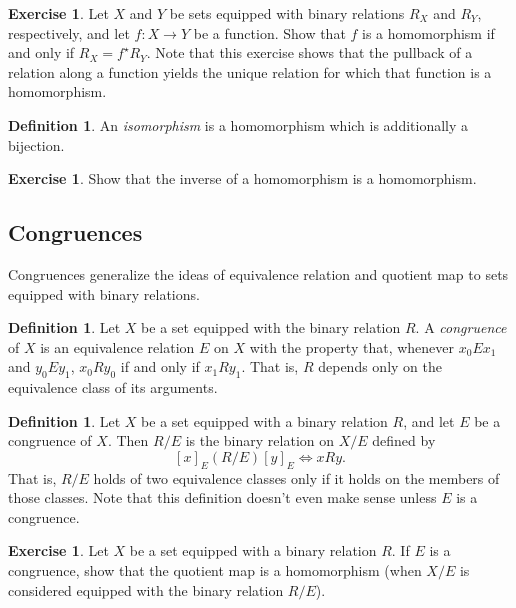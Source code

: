 \documentclass[letterpaper]{article}
\theoremstyle{definition}
\newtheorem{definition}[theorem]{Definition}
\newtheorem{exercise}[theorem]{Exercise}
\newcommand{\defterm}{\emph}
\begin{document}
\begin{exercise}
  Let \(X\) and \(Y\) be sets equipped with binary relations \(R_X\)
  and \(R_Y\), respectively, and let \(f:X \to Y\) be a function.
  Show that \(f\) is a homomorphism if and only if \(R_X = f^\star
  R_Y\).  Note that this exercise shows that the pullback of a
  relation along a function yields the unique relation for which that
  function is a homomorphism.
\end{exercise}

\begin{definition}
  An \defterm{isomorphism} is a homomorphism which is additionally a
  bijection.
\end{definition}

\begin{exercise}
  Show that the inverse of a homomorphism is a homomorphism.
\end{exercise}

\subsection{Congruences}
Congruences generalize the ideas of equivalence relation and quotient
map to sets equipped with binary relations.

\begin{definition}
  Let \(X\) be a set equipped with the binary relation \(R\).  A
  \defterm{congruence} of \(X\) is an equivalence relation \(E\) on
  \(X\) with the property that, whenever \(x_0Ex_1\) and \(y_0Ey_1\),
  \(x_0Ry_0\) if and only if \(x_1Ry_1\).  That is, \(R\) depends only
  on the equivalence class of its arguments.
\end{definition}

\begin{definition}
  Let \(X\) be a set equipped with a binary relation \(R\), and let
  \(E\) be a congruence of \(X\).  Then \(R/E\) is the binary relation
  on \(X/E\) defined by
  \[[x]_E (R/E) [y]_E \iff xRy \text{.}\]
  That is, \(R/E\) holds of two equivalence classes only if it holds
  on the members of those classes.  Note that this definition doesn't
  even make sense unless \(E\) is a congruence.
\end{definition}

\begin{exercise}
  Let \(X\) be a set equipped with a binary relation \(R\).  If \(E\)
  is a congruence, show that the quotient map is a homomorphism (when
  \(X/E\) is considered equipped with the binary relation \(R/E\)).
\end{exercise}
\end{document}
